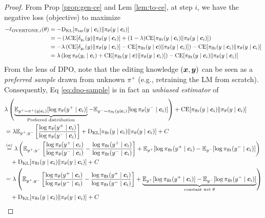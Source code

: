 \begin{proof}
From Prop \ref{prop:gen-ce} and Lem \ref{lem:to-ce}, at step $i$, we have the negative loss (objective) to maximize
\begin{align}
- \ell_{\NAME, i}(\theta)
\notag &= 
- \kl [\pit (y \mid \cv_i) \| \pil(y \mid \cv_i)] \\
\notag &= 
- \left(\lambda \ce [\de{y_i}{y} \| \pil (y \mid \cv_i)] + (1 - \lambda) \ce [\pif(y \mid \cv_i) \| \pil (y \mid \cv_i)] \right) \\
&= 
- \lambda \left( \ce [\de{y_i}{y} \| \pil (y \mid \cv_i)] - \ce [\pif(y \mid \cv) \| \pil (y \mid \cv_i)]\right) - \ce [\pif(y \mid \cv_i) \| \pil (y \mid \cv_i)] \\
&=
\lambda \left ( \log \pil (y_i \mid \cv_i) + \ce [\pif(y \mid \cv) \| \pil (y \mid \cv_i)]\right) - \ce [\pif(y \mid \cv_i) \| \pil (y \mid \cv_i)]
\label{eq:dpo-sample}
\end{align}
From the lens of DPO, 
note that the editing knowledge $(\boldsymbol{x}, \boldsymbol{y})$ can be seen as a \textit{preferred sample} drawn from unknown $\pi^+$ (e.g., retraining the LM from scratch).
Consequently, 
Eq \eqref{eq:dpo-sample} is in fact an \textit{unbiased estimator} of 
\begin{align*}
& \lambda \left(\underbrace{\E_{y^+ \sim \pi^+(y \mid \cv_i) } [\log \pil (y^+ \mid \cv_i)]}_{\text{Preferred distriibution}} - \E_{y^- \sim \pif(y \mid \cv_i)} [\log \pil(y^- \mid \cv_i)] \right) + \ce [\pif(y \mid \cv_i) \| \pil (y \mid \cv_i)] \\
&= 
\lambda \E_{y^+, y^-}\left [ \frac{\log \pil (y^+ \mid \cv_i)}{\log \pil(y^- \mid \cv_i)} \right ] + \kl [\pif(y \mid \cv_i) \| \pil (y \mid \cv_i)] + C \\
&\overset{(a)}{=} 
\lambda 
\left(\E_{y^+, y^-}\left [ \frac{\log \pil (y^+ \mid \cv_i)}{\log \pil(y^- \mid \cv_i)} - \frac{\log \pif (y^+ \mid \cv_i)}{\log \pif(y^- \mid \cv_i)} \right ] + 
\E_{y^+} [\log \pif (y^+ \mid \cv_i) - \E_{y^-} [\log \pif (y^- \mid \cv_i)]
\right) \\
&\quad
+ \kl [\pif(y \mid \cv_i) \| \pil (y \mid \cv_i)] + C \\
&= 
\lambda \left(\E_{y^+, y^-}\left [ \frac{\log \pil (y^+ \mid \cv_i)}{\log \pil(y^- \mid \cv_i)} - \frac{\log \pif (y^+ \mid \cv_i)}{\log \pif(y^- \mid \cv_i)} \right ] + 
\underbrace{\E_{y^+} [\log \pif (y^+ \mid \cv_i)] - \E_{y^-} [\log \pif (y^- \mid \cv_i)]}_{\text{constant wrt $\theta$}}
\right) \\
&\quad
+ \kl [\pif(y \mid \cv_i) \| \pil (y \mid \cv_i)] + C \\

\end{align*}
\end{proof}
